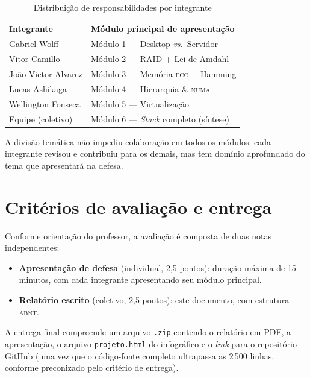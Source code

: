 \begin{table}[h!]
\centering
\caption{Distribuição de responsabilidades por integrante}
\label{tab:equipe}
\begin{tabular}{ll}
\toprule
\textbf{Integrante} & \textbf{Módulo principal de apresentação} \\
\midrule
Gabriel Wolff       & Módulo 1 --- Desktop \textit{vs.}\ Servidor \\
Vitor Camillo       & Módulo 2 --- RAID + Lei de Amdahl \\
João Victor Alvarez & Módulo 3 --- Memória \textsc{ecc} + Hamming \\
Lucas Ashikaga      & Módulo 4 --- Hierarquia \& \textsc{numa} \\
Wellington Fonseca  & Módulo 5 --- Virtualização \\
Equipe (coletivo)   & Módulo 6 --- \emph{Stack} completo (síntese) \\
\bottomrule
\end{tabular}
\end{table}

A divisão temática não impediu colaboração em todos os módulos: cada
integrante revisou e contribuiu para os demais, mas tem domínio
aprofundado do tema que apresentará na defesa.

\section{Critérios de avaliação e entrega}

Conforme orientação do professor, a avaliação é composta de duas
notas independentes:

\begin{itemize}
    \item \textbf{Apresentação de defesa} (individual, 2,5 pontos):
          duração máxima de 15 minutos, com cada integrante
          apresentando seu módulo principal.
    \item \textbf{Relatório escrito} (coletivo, 2,5 pontos): este
          documento, com estrutura \textsc{abnt}.
\end{itemize}

A entrega final compreende um arquivo \texttt{.zip} contendo o
relatório em PDF, a apresentação, o arquivo \texttt{projeto.html} do
infográfico e o \emph{link} para o repositório GitHub (uma vez que
o código-fonte completo ultrapassa as 2\,500 linhas, conforme
preconizado pelo critério de entrega).
